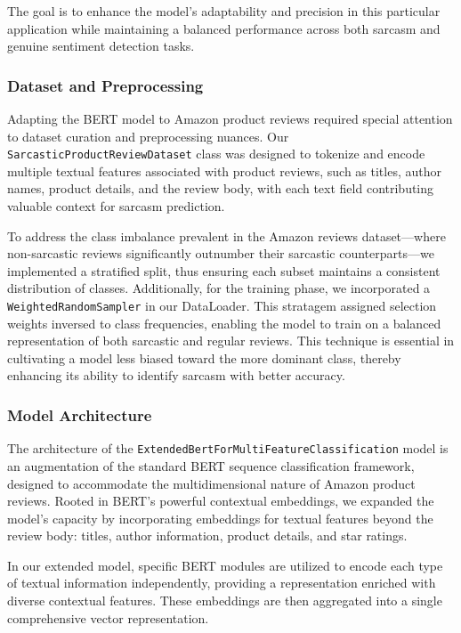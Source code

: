 \documentclass[10pt,twocolumn,letterpaper]{article}
\begin{document}
The goal is to enhance the model's adaptability and precision in this particular application while maintaining a balanced performance across both sarcasm and genuine sentiment detection tasks.

\subsubsection{Dataset and Preprocessing}
Adapting the BERT model to Amazon product reviews required special attention to dataset curation and preprocessing nuances. Our \texttt{SarcasticProductReviewDataset} class was designed to tokenize and encode multiple textual features associated with product reviews, such as titles, author names, product details, and the review body, with each text field contributing valuable context for sarcasm prediction.

To address the class imbalance prevalent in the Amazon reviews dataset—where non-sarcastic reviews significantly outnumber their sarcastic counterparts—we implemented a stratified split, thus ensuring each subset maintains a consistent distribution of classes. Additionally, for the training phase, we incorporated a \texttt{WeightedRandomSampler} in our DataLoader. This stratagem assigned selection weights inversed to class frequencies, enabling the model to train on a balanced representation of both sarcastic and regular reviews. This technique is essential in cultivating a model less biased toward the more dominant class, thereby enhancing its ability to identify sarcasm with better accuracy.

\subsubsection{Model Architecture}

The architecture of the \texttt{ExtendedBertForMultiFeatureClassification} model is an augmentation of the standard BERT sequence classification framework, designed to accommodate the multidimensional nature of Amazon product reviews. Rooted in BERT's powerful contextual embeddings, we expanded the model's capacity by incorporating embeddings for textual features beyond the review body: titles, author information, product details, and star ratings. 

In our extended model, specific BERT modules are utilized to encode each type of textual information independently, providing a representation enriched with diverse contextual features. These embeddings are then aggregated into a single comprehensive vector representation.
\end{document}
